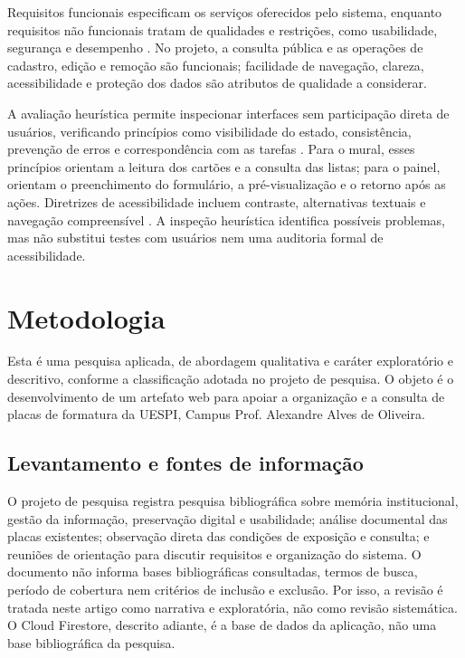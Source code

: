\documentclass[12pt]{article}
\begin{document}
Requisitos funcionais especificam os serviços oferecidos pelo sistema,
enquanto requisitos não funcionais tratam de qualidades e restrições, como
usabilidade, segurança e desempenho \cite{sommerville2015}. No projeto, a
consulta pública e as operações de cadastro, edição e remoção são funcionais;
facilidade de navegação, clareza, acessibilidade e proteção dos dados são
atributos de qualidade a considerar.

A avaliação heurística permite inspecionar interfaces sem participação direta
de usuários, verificando princípios como visibilidade do estado, consistência,
prevenção de erros e correspondência com as tarefas \cite{nielsen1993,
shneiderman2016}. Para o mural, esses princípios orientam a leitura dos cartões
e a consulta das listas; para o painel, orientam o preenchimento do formulário,
a pré-visualização e o retorno após as ações. Diretrizes de acessibilidade
incluem contraste, alternativas textuais e navegação compreensível
\cite{wcag2020}. A inspeção heurística identifica possíveis problemas, mas não
substitui testes com usuários nem uma auditoria formal de acessibilidade.

\section{Metodologia}

Esta é uma pesquisa aplicada, de abordagem qualitativa e caráter exploratório
e descritivo, conforme a classificação adotada no projeto de pesquisa. O objeto
é o desenvolvimento de um artefato web para apoiar a organização e a consulta
de placas de formatura da UESPI, Campus Prof. Alexandre Alves de Oliveira.

\subsection{Levantamento e fontes de informação}

O projeto de pesquisa registra pesquisa bibliográfica sobre memória
institucional, gestão da informação, preservação digital e usabilidade; análise
documental das placas existentes; observação direta das condições de exposição
e consulta; e reuniões de orientação para discutir requisitos e organização
do sistema. O documento não informa bases bibliográficas consultadas, termos
de busca, período de cobertura nem critérios de inclusão e exclusão. Por isso,
a revisão é tratada neste artigo como narrativa e exploratória, não como revisão
sistemática. O Cloud Firestore, descrito adiante, é a base de dados da
aplicação, não uma base bibliográfica da pesquisa.
\end{document}
